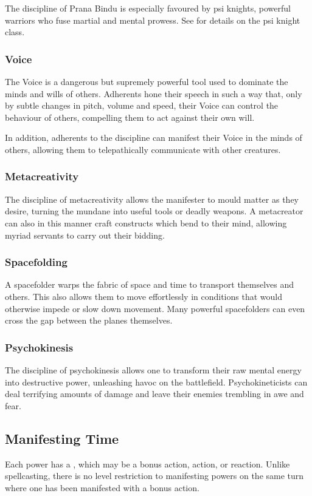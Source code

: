The discipline of Prana Bindu is especially favoured by psi knights,
powerful warriors who fuse martial and mental prowess.
See  for details on the psi knight class.

\subsubsection{Voice}
The Voice is a dangerous but supremely powerful tool
used to dominate the minds and wills of others.
Adherents hone their speech in such a way that,
only by subtle changes in pitch, volume and speed,
their Voice can control the behaviour of others,
compelling them to act against their own will.

In addition, adherents to the discipline can manifest their Voice
in the minds of others, allowing them to telepathically
communicate with other creatures.

\subsubsection{Metacreativity}
The discipline of metacreativity allows the manifester to mould
matter as they desire,
turning the mundane into useful tools or deadly weapons.
A metacreator can also in this manner craft constructs
which bend to their mind,
allowing myriad servants to carry out their bidding.

\subsubsection{Spacefolding}
A spacefolder warps the fabric of space and time to
transport themselves and others.
This also allows them to move effortlessly in conditions
that would otherwise impede or slow down movement. 
Many powerful spacefolders can even cross the gap between
the planes themselves.

\subsubsection{Psychokinesis}
The discipline of psychokinesis allows one to transform
their raw mental energy into destructive power,
unleashing havoc on the battlefield.
Psychokineticists can deal terrifying amounts of damage
and leave their enemies trembling in awe and fear.

\subsection{Manifesting Time}
Each power has a ,
which may be a bonus action, action, or reaction.
Unlike spellcasting,
there is no level restriction to manifesting powers
on the same turn where one has been manifested
with a bonus action. 

